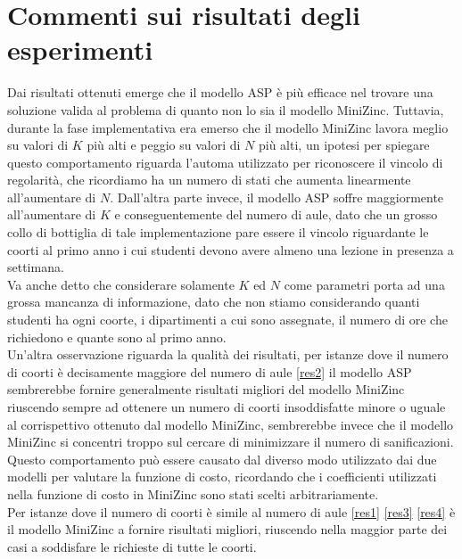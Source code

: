 \documentclass[12pt, italian, openany]{book}
\begin{document}
\section{Commenti sui risultati degli esperimenti}
Dai risultati ottenuti emerge che il modello ASP è più efficace nel trovare una soluzione valida al problema di quanto non lo sia il modello MiniZinc. Tuttavia, durante la fase implementativa era emerso che il modello MiniZinc lavora meglio su valori di $K$ più alti e peggio su valori di $N$ più alti, un ipotesi per spiegare questo comportamento riguarda l'automa utilizzato per riconoscere il vincolo di regolarità, che ricordiamo ha un numero di stati che aumenta linearmente all'aumentare di $N$. Dall'altra parte invece, il modello ASP soffre maggiormente all'aumentare di $K$ e conseguentemente del numero di aule, dato che un grosso collo di bottiglia di tale implementazione pare essere il vincolo riguardante le coorti al primo anno i cui studenti devono avere almeno una lezione in presenza a settimana.\\
Va anche detto che considerare solamente $K$ ed $N$ come parametri porta ad una grossa mancanza di informazione, dato che non stiamo considerando quanti studenti ha ogni coorte, i dipartimenti a cui sono assegnate, il numero di ore che richiedono e quante sono al primo anno.\\
Un'altra osservazione riguarda la qualità dei risultati, per istanze dove il numero di coorti è decisamente maggiore del numero di aule \ref{res2} il modello ASP sembrerebbe fornire generalmente risultati migliori del modello MiniZinc riuscendo sempre ad ottenere un numero di coorti insoddisfatte minore o uguale al corrispettivo ottenuto dal modello MiniZinc, sembrerebbe invece che il modello MiniZinc si concentri troppo sul cercare di minimizzare il numero di sanificazioni. Questo comportamento può essere causato dal diverso modo utilizzato dai due modelli per valutare la funzione di costo, ricordando che i coefficienti utilizzati nella funzione di costo in MiniZinc sono stati scelti arbitrariamente.\\
Per istanze dove il numero di coorti è simile al numero di aule \ref{res1} \ref{res3} \ref{res4} è il modello MiniZinc a fornire risultati migliori, riuscendo nella maggior parte dei casi a soddisfare le richieste di tutte le coorti.
\end{document}
